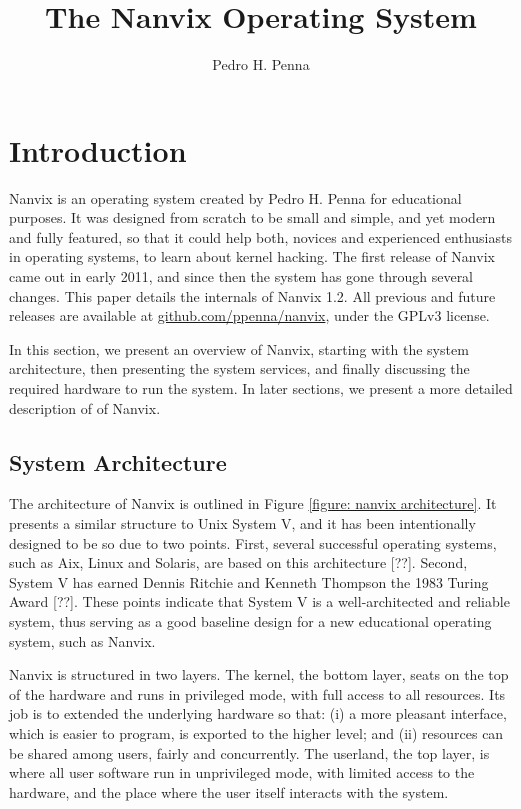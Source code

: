 \documentclass[10pt,a4paper]{article}
\author{Pedro H. Penna}
\title{The Nanvix Operating System}
\begin{document}
\maketitle

\section{Introduction}
\label{section: introduction}

Nanvix is an operating system created by Pedro H. Penna for educational purposes. It was designed from scratch to be small and simple, and yet modern and fully featured, so that it could help both, novices and experienced enthusiasts in operating systems, to learn about kernel hacking. The first release of Nanvix came out in early 2011, and since then the system has gone through several changes. This paper details the internals of Nanvix 1.2. All previous and future releases are available at \url{github.com/ppenna/nanvix}, under the GPLv3 license.

In this section, we present an overview of Nanvix, starting with the system architecture, then presenting the system services, and finally discussing the required hardware to run the system. In later sections, we present a more detailed description of of Nanvix.

\subsection{System Architecture}
\label{section: system architecture}

The architecture of Nanvix is outlined in Figure \ref{figure: nanvix architecture}. It presents a similar structure to Unix System V, and it has been intentionally designed to be so due to two points. First, several successful operating systems, such as Aix, Linux and Solaris, are based on this architecture [??]. Second, System V has earned Dennis Ritchie and Kenneth Thompson the 1983 Turing Award [??]. These points indicate that System V is a well-architected and reliable system, thus serving as a good baseline design for a new educational operating system, such as Nanvix.

Nanvix is structured in two layers. The kernel, the bottom layer, seats on the top of the hardware and runs in privileged mode, with full access to all resources. Its job is to extended the underlying hardware so that: (i) a more pleasant interface, which is easier to program, is exported to the higher level; and (ii) resources can be shared among users, fairly and concurrently. The userland, the top layer, is where all user software run in unprivileged mode, with limited access to the hardware, and the place where the user itself interacts with the system.
\end{document}
